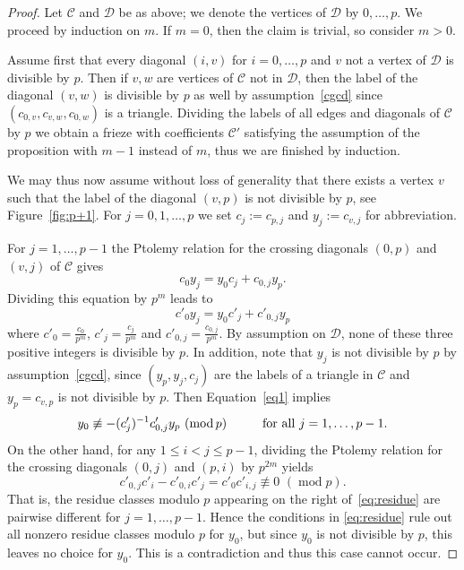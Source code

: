 \documentclass[ALCO,ThmDefs,Unicode,epreuves,published]{cedram}
\numberwithin{equation}{section}
\DeclareMathOperator{\md}{mod}
\begin{document}
\begin{proof}
Let $\mathcal{C}$ and $\mathcal{D}$ be as above; we denote the vertices of $\mathcal{D}$ by $0,\ldots,p$.
We proceed by induction on $m$. If $m=0$, then the claim is trivial, so consider $m>0$.

Assume first that every diagonal $(i,v)$ for $i=0,\ldots,p$ and $v$ not a vertex of $\mathcal{D}$ is divisible by $p$.
Then if $v,w$ are vertices of $\mathcal{C}$ not in $\mathcal{D}$, then the 
label of the diagonal $(v,w)$ is divisible by $p$ as well by assumption~\eqref{cgcd} since $(c_{0,v},c_{v,w},c_{0,w})$ is a triangle.
Dividing the labels of all edges and diagonals of $\mathcal{C}$ by $p$ we obtain a frieze with coefficients $\mathcal{C'}$ satisfying the assumption of the proposition with $m-1$ instead of $m$, thus we are finished by induction.

We may thus now assume without loss of generality that there exists a vertex $v$ such that the label
of the diagonal $(v,p)$ is not divisible by $p$, see Figure~\ref{fig:p+1}.
For $j=0,1,\ldots,p$ we set $c_j:=c_{p,j}$ and $y_j:=c_{v,j}$ for abbreviation.

For $j=1,\ldots,p-1$ 
the Ptolemy relation for the crossing diagonals $(0,p)$ and $(v,j)$ of 
$\mathcal{C}$ gives
\[
c_0y_j = y_0c_j + c_{0,j}y_p.
\]
Dividing this equation by $p^m$ leads to
\begin{equation} \label{eq1}
 c'_0y_j = y_0c'_j + c'_{0,j}y_p
\end{equation}
where $c'_0=\frac{c_0}{p^m}$, $c'_j=\frac{c_j}{p^m}$ and
$c'_{0,j}=\frac{c_{0,j}}{p^m}$. By assumption on $\mathcal{D}$, none of 
these three positive integers is divisible by $p$. 
In addition, note that $y_j$ is not divisible by $p$ by assumption~\eqref{cgcd}, since
$(y_p,y_j,c_j)$ are the labels of a triangle in $\mathcal{C}$ and 
$y_p=c_{v,p}$ is not divisible by $p$.
Then Equation~\eqref{eq1} implies
\begin{equation} \label{eq:residue}
y_0\not\equiv -(c'_j)^{-1} c'_{0,j} y_p\,\,(\md p)
\mbox{\hskip1cm 
for all $j=1,\ldots,p-1$}.
\end{equation}
On the other hand, for any $1\le i< j\le p-1$, dividing the Ptolemy relation for the crossing diagonals
$(0,j)$ and $(p,i)$ by $p^{2m}$ yields 
\[
c'_{0,j} c'_i - c'_{0,i}c'_j = c'_0c'_{i,j} \not\equiv 0
\,\,(\md  p).
\]
That is, the residue classes modulo $p$
appearing on the right of~\eqref{eq:residue}
are pairwise different for $j=1,\ldots,p-1$. Hence the conditions in
\eqref{eq:residue} rule out all nonzero residue classes modulo $p$
for $y_0$, but
since $y_0$ is not divisible by $p$, this leaves no choice for $y_0$. 
This is a contradiction and thus this case cannot occur.
\end{proof}
\end{document}
